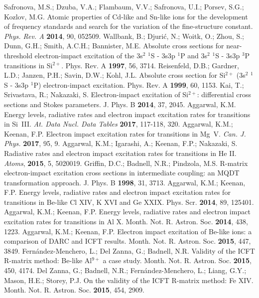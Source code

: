 \documentclass[fleqn]{article}
\begin{document}
\begin{thebibliography}{999}
 Safronova, M.S.;  Dzuba, V.A.; Flambaum, V.V.;  Safronova, U.I.; Porsev, S.G.;   Kozlov, M.G. Atomic properties of Cd-like and Sn-like ions for the development of frequency standards and search for the variation of the fine-structure constant.  {\em Phys. Rev. A} {\bf 2014},   90, 052509.
 Wallbank, B.; Djuri{\'c}, N.; Woitk, O.;   Zhou, S.; Dunn, G.H.; Smith, A.C.H.;  Bannister, M.E.  Absolute cross sections for near-threshold electron-impact excitation of the 3s$^2$ $^1$S - 3s3p $^1$P and 3s$^2$ $^1$S - 3s3p $^3$P  transitions in Si$^{2+}$.  Phys. Rev. A {\bf 1997}, 56, 3714.
  Reisenfeld, D.B.;   Gardner, L.D.;  Janzen, P.H.;  Savin, D.W.; Kohl,  J.L.  Absolute cross section for Si$^{2+}$ (3s$^2$ $^1$S - 3s3p $^1$P) electron-impact excitation. Phys. Rev. A {\bf 1999}, 60, 1153.
 Kai, T.;  Srivastava, R.;  Nakazaki, S.  Electron-impact excitation of Si$^{2+}$: differential cross sections and Stokes parameters.  J. Phys. B {\bf 2014}, 37, 2045.
 Aggarwal, K.M.  Energy levels, radiative rates and electron impact excitation rates for transitions in Si~III. {\em At. Data Nucl. Data Tables}  {\bf 2017}, 117-118, 320. %
 Aggarwal, K.M.; Keenan, F.P.  Electron impact excitation rates for transitions in Mg~V. {\em Can. J. Phys.}  {\bf 2017}, 95, 9.
 Aggarwal, K.M.;  Igarashi, A.; Keenan, F.P.; Nakazaki, S.  Radiative rates and electron impact excitation rates for transitions in He II.  {\em Atoms},  {\bf 2015},   5, 5020019.
 Griffin, D.C.;  Badnell,  N.R.;  Pindzola, M.S.  R-matrix electron-impact excitation cross sections in intermediate coupling: an MQDT transformation approach. J. Phys. B {\bf 1998}, 31, 3713.
 Aggarwal, K.M.;  Keenan, F.P.  Energy levels, radiative rates and electron impact excitation rates for transitions in Be-like Cl XIV, K XVI and Ge XXIX.  Phys. Scr. {\bf 2014}, 89, 125401. 
Aggarwal, K.M.;  Keenan, F.P.   Energy levels, radiative rates and electron impact excitation rates for transitions in Al X.  Month. Not. R. Astron. Soc. {\bf 2014}, 438, 1223. 
 Aggarwal, K.M.;  Keenan, F.P. Electron impact excitation of Be-like ions: a comparison of DARC and ICFT results.  Month. Not. R. Astron. Soc. {\bf 2015}, 447, 3849.
 Fern{\'a}ndez-Menchero, L.;   Del Zanna, G.;   Badnell, N.R. Validity of the ICFT R-matrix method: Be-like Al$^{9+}$ a case study. Month. Not. R. Astron. Soc. {\bf 2015}, 450, 4174.
 Del Zanna, G.;  Badnell, N.R.; Fern{\'a}ndez-Menchero, L.;   Liang, G.Y.;  Mason, H.E.;  Storey, P.J.  On the validity of the ICFT R-matrix method: Fe XIV. Month. Not. R. Astron. Soc. {\bf 2015}, 454, 2909.

\end{thebibliography}
\end{document}
